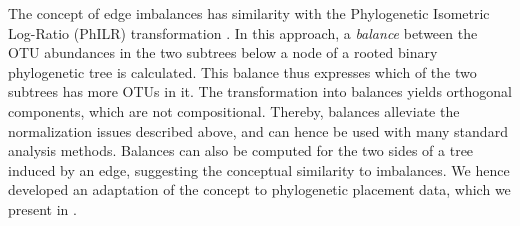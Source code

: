 The concept of edge imbalances has similarity with
the Phylogenetic Isometric Log-Ratio (PhILR) transformation \cite{Silverman2017}.
In this approach, a \emph{balance} between the OTU abundances in the two subtrees below a node
of a rooted binary phylogenetic tree is calculated.
This balance thus expresses which of the two subtrees has more OTUs in it.
The transformation into balances yields orthogonal components, which are not compositional.
Thereby, balances alleviate the normalization issues described above,
and can hence be used with many standard analysis methods.
Balances can also be computed for the two sides of a tree induced by an edge,
suggesting the conceptual similarity to imbalances.
We hence developed an adaptation of the concept to phylogenetic placement data,
which we present in .



